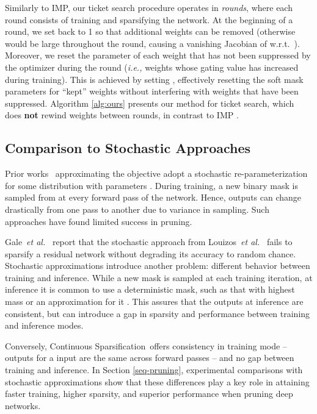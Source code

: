 \documentclass{article}
\newcommand{\ie}{\textit{i.e.,} }
\newcommand{\etal}{\textit{et al.}}
\newcommand{\method}{Continuous Sparsification}
\begin{document}
Similarly to IMP, our ticket search procedure operates in \emph{rounds}, where each round consists of training and sparsifying the network. At the beginning of a round, we set  back to 1 so that additional weights can be removed (otherwise  would be large throughout the round, causing a vanishing Jacobian of  w.r.t.~). Moreover, we reset the parameter  of each weight  that has not been suppressed by the optimizer during the round (\ie weights whose gating value has increased during training). This is achieved by setting , effectively resetting the soft mask parameters  for ``kept'' weights without interfering with weights that have been suppressed. Algorithm \ref{alg:ours} presents our method for ticket search, which does \textbf{not} rewind weights between rounds, in contrast to IMP \cite{lth2}.

\subsection{Comparison to Stochastic Approaches}

Prior works~\cite{l0bernoulli, sparsityl0} approximating the  objective adopt a stochastic re-parameterization  for some distribution  with parameters . During training, a new binary mask  is sampled from  at every forward pass of the network. Hence, outputs can change drastically from one pass to another due to variance in sampling. Such approaches have found limited success in pruning.

Gale~\etal~\cite{stateofsparsity} report that the stochastic approach from Louizos~\etal~\cite{sparsityl0} fails to sparsify a residual network without degrading its accuracy to random chance. Stochastic approximations introduce another problem: different behavior between training and inference. While a new mask is sampled at each training iteration, at inference it is common to use a deterministic mask, such as that with highest mass \cite{l0bernoulli} or an approximation for it \cite{sparsityl0}. This assures that the outputs at inference are consistent, but can introduce a gap in sparsity and performance between training and inference modes.

Conversely, \method~offers consistency in training mode -- outputs for a input are the same across forward passes -- and no gap between training and inference. In Section \ref{seq-pruning}, experimental comparisons with stochastic approximations show that these differences play a key role in attaining faster training, higher sparsity, and superior performance when pruning deep networks.
\end{document}
